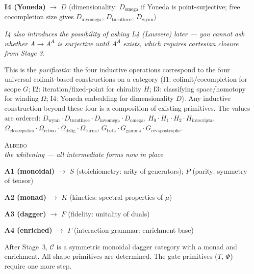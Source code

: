 \documentclass[12pt,a4paper]{article}
\begin{document}
\noindent\textbf{I4 (Yoneda)} $\to$ $D$ (dimensionality: $D_{\text{omega}}$ if Yoneda is point-surjective; free cocompletion size gives $D_{\text{invomega}}$, $D_{\text{turnthree}}$, $D_{\text{wynn}}$)

{\small\itshape I4 also introduces the possibility of asking L4 (Lawvere) later --- you cannot ask whether $A \to A^A$ is surjective until $A^A$ exists, which requires cartesian closure from Stage 3.}

This is the \emph{purificatio}: the four inductive operations correspond to the four universal colimit-based constructions on a category (I1: colimit/cocompletion for scope $G$; I2: iteration/fixed-point for chirality $H$; I3: classifying space/homotopy for winding $\Omega$; I4: Yoneda embedding for dimensionality $D$). Any inductive construction beyond these four is a composition of existing primitives. The values are ordered: $D_{\text{wynn}} \cdot D_{\text{turnthree}} \cdot D_{\text{invomega}} \cdot D_{\text{omega}}$, $H_0 \cdot H_1 \cdot H_2 \cdot H_{\text{invscripta}}$, $\Omega_{\text{closeepsilon}} \cdot \Omega_{\text{crtwo}} \cdot \Omega_{\text{dzlig}} \cdot \Omega_{\text{turna}}$, $G_{\text{beta}} \cdot G_{\text{gamma}} \cdot G_{\text{revapostrophe}}$.

\bigskip
\begin{center}
\vspace{0.5em}
{\large\textsc{Albedo}}
\\[4pt]
{\small\itshape the whitening --- all intermediate forms now in place}
\vspace{0.4em}
\end{center}

\noindent\textbf{A1 (monoidal)} $\to$ $S$ (stoichiometry: arity of generators); $P$ (parity: symmetry of tensor)

\noindent\textbf{A2 (monad)} $\to$ $K$ (kinetics: spectral properties of $\mu$)

\noindent\textbf{A3 (dagger)} $\to$ $F$ (fidelity: unitality of duals)

\noindent\textbf{A4 (enriched)} $\to$ $\Gamma$ (interaction grammar: enrichment base)

After Stage~3, $\mathcal{C}$ is a symmetric monoidal dagger category with a monad and enrichment. All shape primitives are determined. The gate primitives ($T$, $\Phi$) require one more step.
\end{document}
